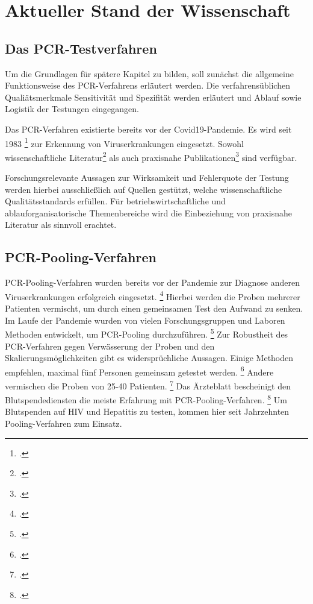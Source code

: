 
\chapter{Aktueller Stand der Wissenschaft}
\section{Das PCR-Testverfahren}
Um die Grundlagen für spätere Kapitel zu bilden, soll zunächst die allgemeine Funktionsweise des PCR-Verfahrens erläutert werden.
Die verfahrensüblichen Qualiätsmerkmale Sensitivität und Spezifität werden erläutert und Ablauf sowie Logistik der Testungen eingegangen.

Das PCR-Verfahren existierte bereits vor der Covid19-Pandemie.
Es wird seit 1983
\footcite{wink_pcr_1994}
zur Erkennung von Viruserkrankungen eingesetzt.
Sowohl wissenschaftliche Literatur\footcite{clewley_polymerase_1995}
als auch praxisnahe Publikationen\footcite{wehrle_weber_pcr_1994}
sind verfügbar.

Forschungsrelevante Aussagen zur Wirksamkeit und Fehlerquote der Testung werden hierbei ausschließlich auf Quellen gestützt, welche wissenschaftliche Qualitätsstandards erfüllen.
Für betriebswirtschaftliche und ablauforganisatorische Themenbereiche wird die Einbeziehung von praxisnahe Literatur als sinnvoll erachtet.

\section{PCR-Pooling-Verfahren}
PCR-Pooling-Verfahren wurden bereits vor der Pandemie zur Diagnose anderen Viruserkrankungen erfolgreich eingesetzt.
\footcite{Aertzeblatt}
Hierbei werden die Proben mehrerer Patienten vermischt, um durch einen gemeinsamen Test den Aufwand zu senken.
Im Laufe der Pandemie wurden von vielen Forschungsgruppen und Laboren Methoden entwickelt, um PCR-Pooling durchzuführen.
\footcite{calabrese_how_2021}
Zur Robustheit des PCR-Verfahren gegen Verwässerung der Proben und den Skalierungsmöglichkeiten gibt es widersprüchliche Aussagen.
Einige Methoden empfehlen, maximal fünf Personen gemeinsam getestet werden.
\footcite{schmidt_novel_2020}
Andere vermischen die Proben von 25-40 Patienten.
\footcite{verwilt_evaluation_2021}
Das Ärzteblatt bescheinigt den Blutspendediensten die meiste Erfahrung mit PCR-Pooling-Verfahren.
\footcite{Aertzeblatt}
Um Blutspenden auf HIV und Hepatitis zu testen, kommen hier seit Jahrzehnten Pooling-Verfahren zum Einsatz.

